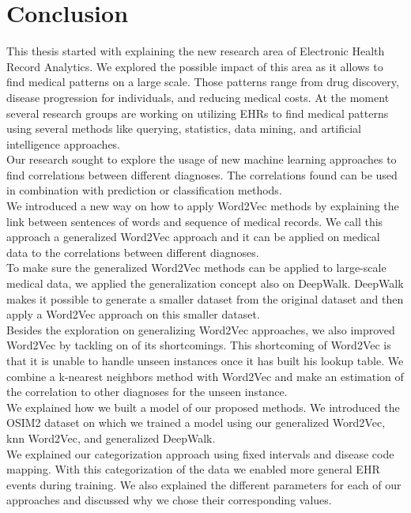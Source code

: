 \chapter{Conclusion}
\label{cha:conclusion}

This thesis started with explaining the new research area of Electronic Health Record Analytics. We explored the possible impact of this area as it allows to find medical patterns on a large scale. Those patterns range from drug discovery, disease progression for individuals, and reducing medical costs. At the moment several research groups are working on utilizing EHRs to find medical patterns using several methods like querying, statistics, data mining, and artificial intelligence approaches. \\
Our research sought to explore the usage of new machine learning approaches to find correlations between different diagnoses. The correlations found can be used in combination with prediction or classification methods. \\

We introduced a new way on how to apply Word2Vec methods by explaining the link between sentences of words and sequence of medical records. We call this approach a generalized Word2Vec approach and it can be applied on medical data to the correlations between different diagnoses. \\
To make sure the generalized Word2Vec methods can be applied to large-scale medical data, we applied the generalization concept also on DeepWalk. DeepWalk makes it possible to generate a smaller dataset from the original dataset and then apply a Word2Vec approach on this smaller dataset. \\
Besides the exploration on generalizing Word2Vec approaches, we also improved Word2Vec by tackling on of its shortcomings. This shortcoming of Word2Vec is that it is unable to handle unseen instances once it has built his lookup table. We combine a k-nearest neighbors method with Word2Vec and make an estimation of the correlation to other diagnoses for the unseen instance. \\

We explained how we built a model of our proposed methods. We introduced the OSIM2 dataset on which we trained a model using our generalized Word2Vec, knn Word2Vec, and generalized DeepWalk. \\
We explained our categorization approach using fixed intervals and disease code mapping. With this categorization of the data we enabled more general EHR events during training. We also explained the different parameters for each of our approaches and discussed why we chose their corresponding values. \\


